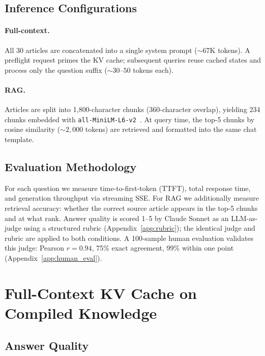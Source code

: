 \documentclass{article}
\begin{document}
\subsection{Inference Configurations}

\paragraph{Full-context.}
All 30 articles are concatenated into a single system prompt (${\sim}67$K
tokens). A preflight request primes the KV cache; subsequent queries
reuse cached states and process only the question suffix (${\sim}30$--$50$
tokens each).

\paragraph{RAG.}
Articles are split into 1,800-character chunks (360-character overlap),
yielding 234 chunks embedded with \texttt{all-MiniLM-L6-v2}~\cite{reimers2019sentencebert}.
At query time, the top-5 chunks by cosine similarity (${\sim}2{,}000$
tokens) are retrieved and formatted into the same chat template.

\subsection{Evaluation Methodology}

For each question we measure time-to-first-token (TTFT), total response
time, and generation throughput via streaming SSE. For RAG we additionally
measure retrieval accuracy: whether the correct source article appears in
the top-5 chunks and at what rank. Answer quality is scored 1--5 by Claude
Sonnet as an LLM-as-judge using a structured rubric
(Appendix~\ref{app:rubric}); the identical judge and rubric are applied
to both conditions. A 100-sample human evaluation validates this judge:
Pearson $r = 0.94$, 75\% exact agreement, 99\% within one point
(Appendix~\ref{app:human_eval}).

\section{Full-Context KV Cache on Compiled Knowledge}
\label{sec:h1}

\subsection{Answer Quality}
\end{document}
